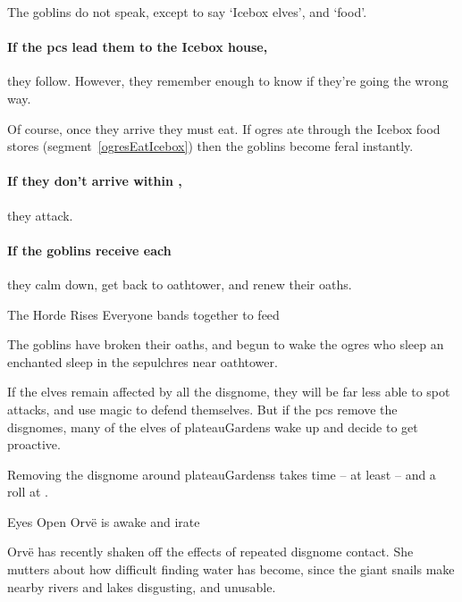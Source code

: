 \begin{multicols}{2}
The goblins do not speak, except to say `Icebox elves', and `food'.

\paragraph{If the \glspl{pc} lead them to the Icebox house,}
they follow.
However, they remember enough to know if they're going the wrong way.

Of course, once they arrive they must eat.
If \glspl{ogre} ate through the Icebox food stores (\gls{segment}~\vref{ogresEatIcebox}) then the goblins become feral instantly.


\paragraph{If they don't arrive within ,}
they attack.

\paragraph{If the goblins receive  each}
they calm down, get back to \gls{oathtower}, and renew their oaths.


{The Horde Rises}%
{Everyone bands together to feed}%

The goblins have broken their oaths, and begun to wake the \glspl{ogre} who sleep an enchanted sleep in the \glspl{sepulchre} near \gls{oathtower}.

\goblin


\noindent
If the elves remain affected by all the \gls{disgnome}, they will be far less able to spot attacks, and use magic to defend themselves.
But if the \glspl{pc} remove the \glspl{disgnome},
many of the elves of \gls{plateauGardens} wake up and decide to get proactive.

Removing the \gls{disgnome} around \glspl{plateauGardens} takes time -- at least  -- and a  roll at \tn[10].

\setcounter{segNo}{-1}

{Eyes Open}%
{Orv\"e is awake and irate}%

Orv\"e has recently shaken off the effects of repeated \gls{disgnome} contact.
She mutters about how difficult finding water has become, since the giant snails make nearby rivers and lakes disgusting, and unusable.


\end{multicols}
